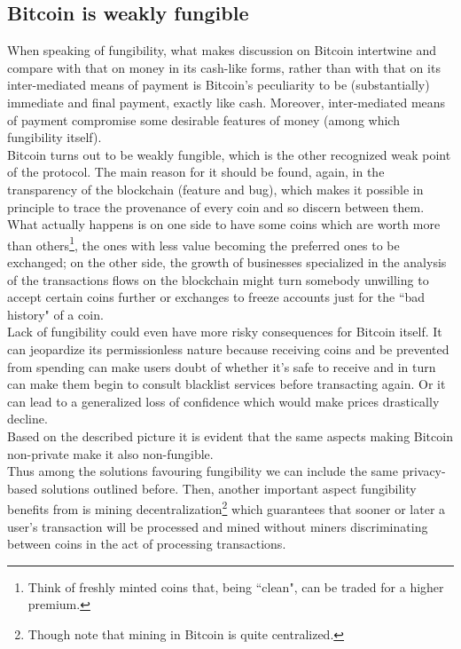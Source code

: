 \subsection{Bitcoin is weakly fungible}
When speaking of fungibility, what makes discussion on Bitcoin intertwine and compare with that on money in its cash-like forms, rather than with that on its inter-mediated means of payment is Bitcoin's peculiarity to be (substantially) immediate and final payment, exactly like cash. Moreover, inter-mediated means of payment compromise some desirable features of money (among which fungibility itself).\\
Bitcoin turns out to be weakly fungible, which is the other recognized weak point of the protocol. The main reason for it should be found, again, in the transparency of the blockchain (feature and bug), which makes it possible in principle to trace the provenance of every coin and so discern between them. What actually happens is on one side to have some coins which are worth more than others\footnote{Think of freshly minted coins that, being ``clean", can be traded for a higher premium.}, the ones with less value becoming the preferred ones to be exchanged; on the other side, the growth of businesses specialized in the analysis of the transactions flows on the blockchain might turn somebody unwilling to accept certain coins further or exchanges to freeze accounts just for the ``bad history" of a coin.\\
Lack of fungibility could even have more risky consequences for Bitcoin itself. It can jeopardize its permissionless nature because receiving coins and be prevented from spending can make users doubt of whether it's safe to receive and in turn can make them begin to consult blacklist services before transacting again. Or it can lead to a generalized loss of confidence which would make prices drastically decline.\\
Based on the described picture it is evident that the same aspects making Bitcoin non-private make it also non-fungible.\\
Thus among the solutions favouring fungibility we can include the same privacy-based solutions outlined before. Then, another important aspect fungibility benefits from is mining decentralization\footnote{Though note that mining in Bitcoin is quite centralized.} which guarantees that sooner or later a user's transaction will be processed and mined without miners discriminating between coins in the act of processing transactions.
